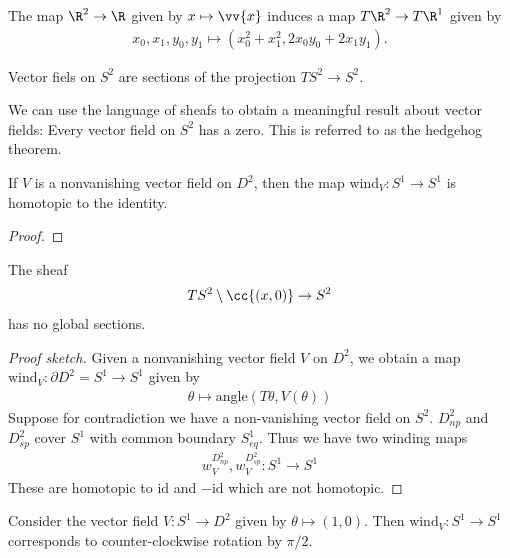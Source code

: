 \documentclass{article}
\begin{document}
The map $\R^2\to\R$ given by $x\mapsto\vv{x}$ induces a map
$T\R^2 \to T\R^1$ given by
\begin{align*}
  x_0,x_1,y_0,y_1\mapsto (x_0^2 + x_1^2, 2x_0y_0+2x_1y_1).
\end{align*}

\begin{definition}
  Vector fiels on $S^2$ are sections of the projection $TS^2\to S^2$.
\end{definition}

We can use the language of sheafs to obtain a meaningful result about
vector fields: Every vector field on $S^2$ has a zero. This is referred to
as the hedgehog theorem. 

\begin{lemma}
  If $V$ is a nonvanishing vector field on $D^2$, then the map
  $\text{wind}_V:S^1\to S^1$ is homotopic to the identity.
  \begin{proof}
    \missingproof
  \end{proof}
\end{lemma}

\begin{theorem}
  The sheaf
  \begin{align*}
    TS^2 \setminus \cc{(x,0)}\to S^2
  \end{align*}
  has no global sections.
  \begin{proof}[Proof sketch]
    Given a nonvanishing vector field $V$ on $D^2$, we obtain a map
    $\text{wind}_V:\partial D^2=S^1 \to S^1$ given by
    \begin{align*}
      \theta \mapsto \text{angle}(T\theta,V(\theta))
    \end{align*}
    Suppose for contradiction we have a non-vanishing vector field
    on $S^2$. $D^2_{np}$ and $D^2_{sp}$ cover $S^1$ with common boundary
    $S^1_{eq}$. Thus we have two winding maps
    \begin{align*}
      w_V^{D^2_{np}},w_V^{D^2_{sp}}:S^1\to S^1
    \end{align*}
    These are homotopic to $\text{id}$ and $-\text{id}$ which are not
    homotopic.
  \end{proof}
\end{theorem}

\begin{example}
  Consider the vector field $V:S^1\to D^2$ given by $\theta\mapsto(1,0)$.
  Then $\text{wind}_V:S^1\to S^1$ corresponds to counter-clockwise rotation
  by $\pi/2$.
\end{example}
\end{document}
